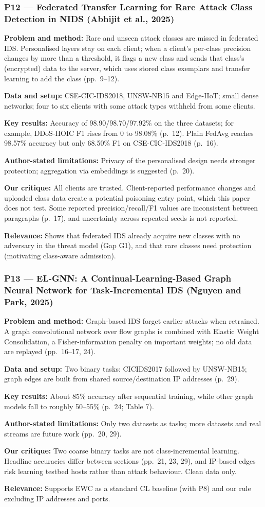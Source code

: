 \documentclass[10pt,a4paper]{article}
\newcommand{\sumitem}[2]{\noindent\textbf{#1:} #2\par}
\begin{document}
\subsubsection*{P12 --- Federated Transfer Learning for Rare Attack Class Detection in NIDS (Abhijit et al., 2025)}
\sumitem{Problem and method}{Rare and unseen attack classes are missed in federated IDS. Personalised layers stay on each client; when a client's per-class precision changes by more than a threshold, it flags a new class and sends that class's (encrypted) data to the server, which uses stored class exemplars and transfer learning to add the class (pp.~9--12).}
\sumitem{Data and setup}{CSE-CIC-IDS2018, UNSW-NB15 and Edge-IIoT; small dense networks; four to six clients with some attack types withheld from some clients.}
\sumitem{Key results}{Accuracy of 98.90/98.70/97.92\% on the three datasets; for example, DDoS-HOIC F1 rises from 0 to 98.08\% (p.~12). Plain FedAvg reaches 98.57\% accuracy but only 68.50\% F1 on CSE-CIC-IDS2018 (p.~16).}
\sumitem{Author-stated limitations}{Privacy of the personalised design needs stronger protection; aggregation via embeddings is suggested (p.~20).}
\sumitem{Our critique}{All clients are trusted. Client-reported performance changes and uploaded class data create a potential poisoning entry point, which this paper does not test. Some reported precision/recall/F1 values are inconsistent between paragraphs (p.~17), and uncertainty across repeated seeds is not reported.}
\sumitem{Relevance}{Shows that federated IDS already acquire new classes with no adversary in the threat model (Gap G1), and that rare classes need protection (motivating class-aware admission).}

\subsubsection*{P13 --- EL-GNN: A Continual-Learning-Based Graph Neural Network for Task-Incremental IDS (Nguyen and Park, 2025)}
\sumitem{Problem and method}{Graph-based IDS forget earlier attacks when retrained. A graph convolutional network over flow graphs is combined with Elastic Weight Consolidation, a Fisher-information penalty on important weights; no old data are replayed (pp.~16--17, 24).}
\sumitem{Data and setup}{Two binary tasks: CICIDS2017 followed by UNSW-NB15; graph edges are built from shared source/destination IP addresses (p.~29).}
\sumitem{Key results}{About 85\% accuracy after sequential training, while other graph models fall to roughly 50--55\% (p.~24; Table 7).}
\sumitem{Author-stated limitations}{Only two datasets as tasks; more datasets and real streams are future work (pp.~20, 29).}
\sumitem{Our critique}{Two coarse binary tasks are not class-incremental learning. Headline accuracies differ between sections (pp.~21, 23, 29), and IP-based edges risk learning testbed hosts rather than attack behaviour. Clean data only.}
\sumitem{Relevance}{Supports EWC as a standard CL baseline (with P8) and our rule excluding IP addresses and ports.}
\end{document}
